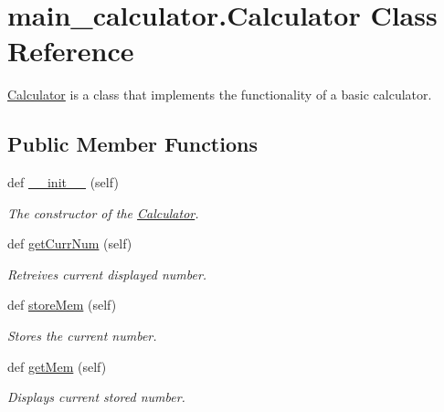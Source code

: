 \hypertarget{classmain__calculator_1_1_calculator}{}\section{main\+\_\+calculator.\+Calculator Class Reference}
\label{classmain__calculator_1_1_calculator}


\hyperlink{classmain__calculator_1_1_calculator}{Calculator} is a class that implements the functionality of a basic calculator.  


\subsection*{Public Member Functions}
\begin{DoxyCompactItemize}
\item 
\mbox{\label{classmain__calculator_1_1_calculator_a45a76b7d3db5c433160e9f54adcee065}} 
def \hyperlink{classmain__calculator_1_1_calculator_a45a76b7d3db5c433160e9f54adcee065}{\+\_\+\+\_\+init\+\_\+\+\_\+} (self)
\begin{DoxyCompactList}\small\item\em The constructor of the \hyperlink{classmain__calculator_1_1_calculator}{Calculator}. \end{DoxyCompactList}\item 
\mbox{\label{classmain__calculator_1_1_calculator_ab677caea0b75a1a1d42b08e853d16960}} 
def \hyperlink{classmain__calculator_1_1_calculator_ab677caea0b75a1a1d42b08e853d16960}{get\+Curr\+Num} (self)
\begin{DoxyCompactList}\small\item\em Retreives current displayed number. \end{DoxyCompactList}\item 
def \hyperlink{classmain__calculator_1_1_calculator_a0e35cd11d7b3815e8158c0866686da02}{store\+Mem} (self)
\begin{DoxyCompactList}\small\item\em Stores the current number. \end{DoxyCompactList}\item 
def \hyperlink{classmain__calculator_1_1_calculator_affb70322f0ae2566a352414980fc4c76}{get\+Mem} (self)
\begin{DoxyCompactList}\small\item\em Displays current stored number. \end{DoxyCompactList}\item 

\end{DoxyCompactItemize}
